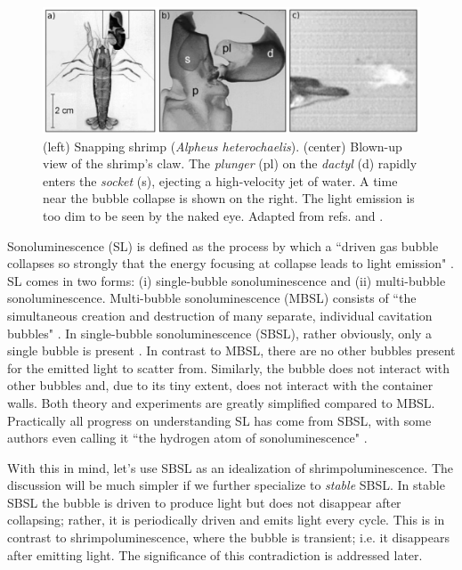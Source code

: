 \documentclass[11pt,prb,aps,nofootinbib,superscriptaddress,floatfix]{revtex4-2}
\begin{document}
\begin{figure}
\includegraphics[width=0.85\linewidth]{figs/shrimp.pdf}
    \caption{(left) Snapping shrimp (\emph{Alpheus heterochaelis}). (center) Blown-up view of the shrimp's claw. The \emph{plunger} (pl) on the \emph{dactyl} (d) rapidly enters the \emph{socket} (s), ejecting a high-velocity jet of water. A time near the bubble collapse is shown on the right. The light emission is too dim to be seen by the naked eye. Adapted from refs. \cite{versluis2000snapping} and \cite{lohse2001snapping}.}
\label{fig:shrimp}
\end{figure}

Sonoluminescence (SL) is defined as the process by which a ``driven gas bubble collapses so strongly that the energy focusing at collapse leads to light emission" \cite{brenner2002single}. SL comes in two forms: (i) single-bubble sonoluminescence and (ii) multi-bubble sonoluminescence. Multi-bubble sonoluminescence (MBSL) consists of  ``the simultaneous creation and destruction of many separate, individual cavitation bubbles" \cite{crum1994sonoluminescence,brenner2002single}. In single-bubble sonoluminescence (SBSL), rather obviously, only a single bubble is present \cite{gaitan1992sonoluminescence}. In contrast to MBSL, there are no other bubbles present for the emitted light to scatter from. Similarly, the bubble does not interact with other bubbles and, due to its tiny extent, does not interact with the container walls. Both theory and experiments are greatly simplified compared to MBSL. Practically all progress on understanding SL has come from SBSL, with some authors even calling it ``the hydrogen atom of sonoluminescence" \cite{lohse2018bubble,crum1994sonoluminescence}. 

With this in mind, let's use SBSL as an idealization of shrimpoluminescence. The discussion will be much simpler if we further specialize to \emph{stable} SBSL. In stable SBSL the bubble is driven to produce light but does not disappear after collapsing; rather, it is periodically driven and emits light every cycle. This is in contrast to shrimpoluminescence, where the bubble is transient; i.e. it disappears after emitting light. The significance of this contradiction is addressed later.
\end{document}

